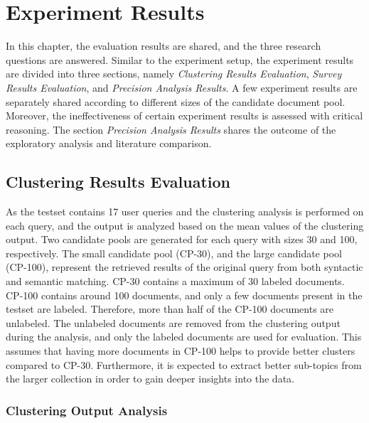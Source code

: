 
\chapter{Experiment Results}

In this chapter, the evaluation results are shared, and the three research questions are answered. Similar to the experiment setup, the experiment results are divided into three sections, namely \emph{Clustering Results Evaluation}, \emph{Survey Results Evaluation}, and \emph{Precision Analysis Results}. A few experiment results are separately shared according to different sizes of the candidate document pool. Moreover, the ineffectiveness of certain experiment results is assessed with critical reasoning. The section \emph{Precision Analysis Results} shares the outcome of the exploratory analysis and literature comparison.

\section{Clustering Results Evaluation}

As the testset contains 17 user queries and the clustering analysis is performed on each query, and the output is analyzed based on the mean values of the clustering output. Two candidate pools are generated for each query with sizes 30 and 100, respectively. The small candidate pool (CP-30), and the large candidate pool (CP-100), represent the retrieved results of the original query from both syntactic and semantic matching. CP-30 contains a maximum of 30 labeled documents. CP-100 contains around 100 documents, and only a few documents present in the testset are labeled. Therefore, more than half of the CP-100 documents are unlabeled. The unlabeled documents are removed from the clustering output during the analysis, and only the labeled documents are used for evaluation. This assumes that having more documents in CP-100 helps to provide better clusters compared to CP-30. Furthermore, it is expected to extract better sub-topics from the larger collection in order to gain deeper insights into the data.

\subsection{Clustering Output Analysis}

